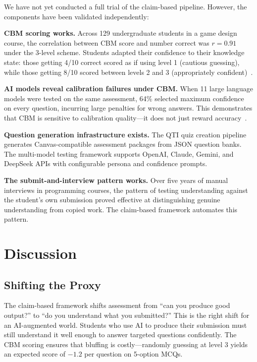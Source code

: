 \documentclass[sigconf]{acmart}
\begin{document}
We have not yet conducted a full trial of the claim-based pipeline. However, the components have been validated independently:

\textbf{CBM scoring works.} Across 129 undergraduate students in a game design course, the correlation between CBM score and number correct was $r = 0.91$ under the 3-level scheme. Students adapted their confidence to their knowledge state: those getting 4/10 correct scored as if using level 1 (cautious guessing), while those getting 8/10 scored between levels 2 and 3 (appropriately confident)~\cite{mccallum2026metacognition}.

\textbf{AI models reveal calibration failures under CBM.} When 11 large language models were tested on the same assessment, 64\% selected maximum confidence on every question, incurring large penalties for wrong answers. This demonstrates that CBM is sensitive to calibration quality---it does not just reward accuracy~\cite{mccallum2026metacognition}.

\textbf{Question generation infrastructure exists.} The QTI quiz creation pipeline generates Canvas-compatible assessment packages from JSON question banks. The multi-model testing framework supports OpenAI, Claude, Gemini, and DeepSeek APIs with configurable persona and confidence prompts.

\textbf{The submit-and-interview pattern works.} Over five years of manual interviews in programming courses, the pattern of testing understanding against the student's own submission proved effective at distinguishing genuine understanding from copied work. The claim-based framework automates this pattern.

\section{Discussion}

\subsection{Shifting the Proxy}

The claim-based framework shifts assessment from ``can you produce good output?'' to ``do you understand what you submitted?'' This is the right shift for an AI-augmented world. Students who use AI to produce their submission must still understand it well enough to answer targeted questions confidently. The CBM scoring ensures that bluffing is costly---randomly guessing at level 3 yields an expected score of $-1.2$ per question on 5-option MCQs.
\end{document}
